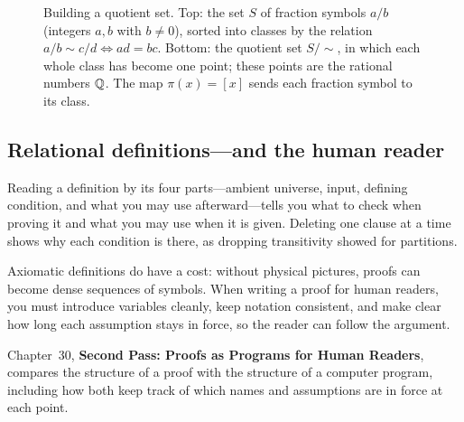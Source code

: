 \begin{figure}[htbp]
\caption{Building a quotient set. Top: the set $S$ of fraction symbols $a/b$ (integers $a, b$ with $b \neq 0$), sorted into classes by the relation $a/b \sim c/d \iff ad = bc$. Bottom: the quotient set $S/{\sim}$, in which each whole class has become one point; these points are the rational numbers $\mathbb{Q}$. The map $\pi(x) = [x]$ sends each fraction symbol to its class.}
\label{29:fig-quotient}
\end{figure}

\subsection{Relational definitions---and the human reader}

Reading a definition by its four parts---ambient universe, input, defining condition, and what you may use afterward---tells you what to check when proving it and what you may use when it is given. Deleting one clause at a time shows why each condition is there, as dropping transitivity showed for partitions.

Axiomatic definitions do have a cost: without physical pictures, proofs can become dense sequences of symbols. When writing a proof for human readers, you must introduce variables cleanly, keep notation consistent, and make clear how long each assumption stays in force, so the reader can follow the argument.

Chapter~30, \textbf{Second Pass: Proofs as Programs for Human Readers}, compares the structure of a proof with the structure of a computer program, including how both keep track of which names and assumptions are in force at each point.

